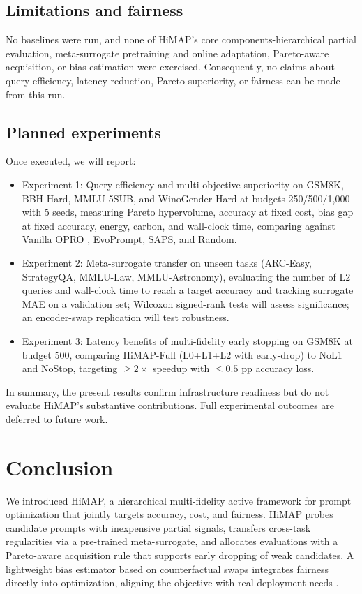 \documentclass{article}
\begin{document}
\subsection{Limitations and fairness}
No baselines were run, and none of HiMAP's core components-hierarchical partial evaluation, meta-surrogate pretraining and online adaptation, Pareto-aware acquisition, or bias estimation-were exercised. Consequently, no claims about query efficiency, latency reduction, Pareto superiority, or fairness can be made from this run.

\subsection{Planned experiments}
Once executed, we will report:
\begin{itemize}
  \item Experiment 1: Query efficiency and multi-objective superiority on GSM8K, BBH-Hard, MMLU-5SUB, and WinoGender-Hard at budgets 250/500/1,000 with 5 seeds, measuring Pareto hypervolume, accuracy at fixed cost, bias gap at fixed accuracy, energy, carbon, and wall-clock time, comparing against Vanilla OPRO \cite{yang-2023-large}, EvoPrompt, SAPS, and Random.
  \item Experiment 2: Meta-surrogate transfer on unseen tasks (ARC-Easy, StrategyQA, MMLU-Law, MMLU-Astronomy), evaluating the number of L2 queries and wall-clock time to reach a target accuracy and tracking surrogate MAE on a validation set; Wilcoxon signed-rank tests will assess significance; an encoder-swap replication will test robustness.
  \item Experiment 3: Latency benefits of multi-fidelity early stopping on GSM8K at budget 500, comparing HiMAP-Full (L0+L1+L2 with early-drop) to NoL1 and NoStop, targeting \(\geq 2\times\) speedup with \(\leq 0.5\) pp accuracy loss.
\end{itemize}

In summary, the present results confirm infrastructure readiness but do not evaluate HiMAP's substantive contributions. Full experimental outcomes are deferred to future work.

\section{Conclusion}
We introduced HiMAP, a hierarchical multi-fidelity active framework for prompt optimization that jointly targets accuracy, cost, and fairness. HiMAP probes candidate prompts with inexpensive partial signals, transfers cross-task regularities via a pre-trained meta-surrogate, and allocates evaluations with a Pareto-aware acquisition rule that supports early dropping of weak candidates. A lightweight bias estimator based on counterfactual swaps integrates fairness directly into optimization, aligning the objective with real deployment needs \cite{ma-2023-fairness}.
\end{document}
